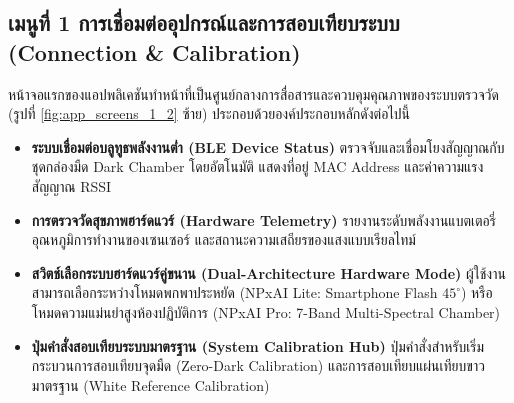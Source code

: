 \documentclass[12pt,a4paper,oneside]{book}
\begin{document}
\subsection{เมนูที่ 1 การเชื่อมต่ออุปกรณ์และการสอบเทียบระบบ (Connection \& Calibration)}
หน้าจอแรกของแอปพลิเคชันทำหน้าที่เป็นศูนย์กลางการสื่อสารและควบคุมคุณภาพของระบบตรวจวัด (รูปที่ \ref{fig:app_screens_1_2} ซ้าย) ประกอบด้วยองค์ประกอบหลักดังต่อไปนี้
\begin{itemize}
    \item \textbf{ระบบเชื่อมต่อบลูทูธพลังงานต่ำ (BLE Device Status)} ตรวจจับและเชื่อมโยงสัญญาณกับชุดกล่องมืด Dark Chamber โดยอัตโนมัติ แสดงที่อยู่ MAC Address และค่าความแรงสัญญาณ RSSI
    \item \textbf{การตรวจวัดสุขภาพฮาร์ดแวร์ (Hardware Telemetry)} รายงานระดับพลังงานแบตเตอรี่ อุณหภูมิการทำงานของเซนเซอร์ และสถานะความเสถียรของแสงแบบเรียลไทม์
    \item \textbf{สวิตช์เลือกระบบฮาร์ดแวร์คู่ขนาน (Dual-Architecture Hardware Mode)} ผู้ใช้งานสามารถเลือกระหว่างโหมดพกพาประหยัด (NPxAI Lite: Smartphone Flash $45^\circ$) หรือโหมดความแม่นยำสูงห้องปฏิบัติการ (NPxAI Pro: 7-Band Multi-Spectral Chamber)
    \item \textbf{ปุ่มคำสั่งสอบเทียบระบบมาตรฐาน (System Calibration Hub)} ปุ่มคำสั่งสำหรับเริ่มกระบวนการสอบเทียบจุดมืด (Zero-Dark Calibration) และการสอบเทียบแผ่นเทียบขาวมาตรฐาน (White Reference Calibration)
\end{itemize}
\end{document}
